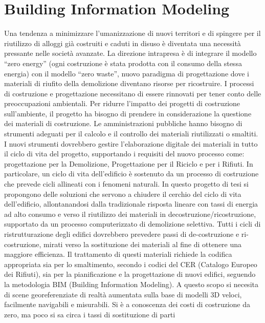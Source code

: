 \section{Building Information Modeling}
\label{sec:chapter_1_section_1}
\noindent

Una tendenza a minimizzare l'umanizzazione di nuovi territori e di spingere per il riutilizzo di alloggi
già costruiti e caduti in disuso è diventata una necessità pressante nelle società avanzate.
La direzione intrapresa è di integrare il modello ``zero energy'' (ogni costruzione è stata prodotta con il
consumo della stessa energia) con il modello ``zero waste'', nuovo paradigma di progettazione dove i materiali di
riufito della demolizione diventano risorse per ricostruire\cite{altamura:12}.
I processi di costruzione e progettazione necessitano di essere rinnovati per tener conto delle preoccupazioni
ambientali. Per ridurre l'impatto dei progetti di costruzione sull'ambiente, il progetto ha bisogno di prendere in
considerazione la questione dei materiali di costruzione.
Le amministrazioni pubbliche hanno bisogno di strumenti adeguati per il calcolo e il controllo dei materiali
riutilizzati o smaltiti.
I nuovi strumenti dovrebbero gestire l'elaborazione digitale dei materiali in tutto il ciclo di vita del progetto,
supportando i requisiti del nuovo processo come: progettazione per la Demolizione, Progettazione per il Riciclo e per i Rifiuti.
In particolare, un ciclo di vita dell'edificio è sostenuto da un processo di costruzione che prevede cicli allineati
con i fenomeni naturali.
In questo progetto di tesi si propongono delle  soluzioni che servono a chiudere il cerchio del ciclo di vita dell'edificio,
allontanandosi dalla tradizionale risposta lineare con tassi di energia ad alto consumo e verso il riutilizzo
dei materiali in decostruzione/ricostruzione, supportato da un processo computerizzato di demolizione selettiva.
Tutti i cicli di ristrutturazione degli edifici dovrebbero prevedere passi di de-costruzione e ri-costruzione, mirati
verso la sostituzione dei materiali al fine di ottenere una maggiore efficienza. Il trattamento di questi materiali
richiede la codifica appropriata sia per lo smaltimento, secondo i codici del CER (Catalogo Europeo dei Rifiuti),
sia per la pianificazione e la progettazione di nuovi edifici, seguendo la metodologia BIM (Building Information Modeling).
A questo scopo si necesita di scene georeferenziate di realtà aumentata sulla base di modelli 3D veloci,
facilmente navigabili e misurabili.
Si è a conoscenza dei costi di costruzione da zero, ma poco si sa circa i tassi di sostituzione di parti
